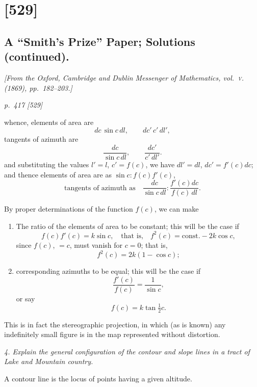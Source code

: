 \documentclass[11pt,a4paper]{article}
\theoremstyle{plain}
\theoremstyle{definition}
\begin{document}
\section{[529]}
\subsection{A ``Smith's Prize'' Paper; Solutions (continued).}

\begin{center}
\textit{[From the Oxford, Cambridge and Dublin Messenger of Mathematics, vol.~\textsc{v}. (1869), pp.~182--203.]}
\end{center}

\bigskip
\textit{p.~417 [529]}
\smallskip

\noindent
whence, elements of area are
\[
dc\,\sin c\,dl,\qquad dc'\,c'\,dl',
\]
tangents of azimuth are
\[
\frac{dc}{\sin c\,dl},\qquad \frac{dc'}{c'\,dl'}.
\]
and substituting the values $l'=l$, $c'=f(c)$, we have $dl'=dl$, $dc'=f'(c)dc$; and thence
elements of area are as $\sin c:f(c)f'(c)$,
\[
\text{tangents of azimuth as}\quad
\frac{dc}{\sin c\,dl}:\frac{f'(c)dc}{f(c)\,dl}.
\]

By proper determinations of the function $f(c)$, we can make

\begin{enumerate}[label=(\arabic*)]
\item The ratio of the elements of area to be constant; this will be the case if
\[
f(c)f'(c)=k\sin c,\quad \text{that is,}\quad f^2(c)=\text{const.}-2k\cos c,
\]
since $f(c)$, $=c$, must vanish for $c=0$; that is,
\[
f^2(c)=2k(1-\cos c);
\]
\item corresponding azimuths to be equal; this will be the case if
\[
\frac{f'(c)}{f(c)}=\frac{1}{\sin c},
\]
or say
\[
f(c)=k\tan\tfrac{1}{2}c.
\]
\end{enumerate}

This is in fact the stereographic projection, in which (as is known) any indefinitely small figure is in the map represented without distortion.

\textit{4. Explain the general configuration of the contour and slope lines in a tract of Lake and Mountain country.}

A contour line is the locus of points having a given altitude.
\end{document}
